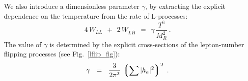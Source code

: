 \documentclass[12pt]{revtex4}
\newcommand{\lgr}{\left\lgroup}
\newcommand{\rgr}{\right\rgroup}
\newcommand{\Mpl}{M_{\rm Pl}}
\newcommand{\ov}{\overline}
\begin{document}
	We also introduce a dimensionless parameter $ \gamma $, 
	by extracting the explicit dependence on the temperature from
	the rate of L-processes:
\begin{equation*}
	4\, W_{LL} ~~+~~ 2\, W_{L\ov{H}} ~~=~~ 
		 \gamma\, \frac{T^6}{M_R^2}~.
\end{equation*}
	The value of $ \gamma $ is determined by the explicit 
	cross-sections of the lepton-number flipping processes
	(see Fig.~\ref{lflip_fig}):
\begin{equation}
\label{gamma}
	\gamma  ~~=~~ \frac{3}{2\pi^2}\, \lgr \sum |h_a|^2 \rgr^2~.
\end{equation}
\end{document}
